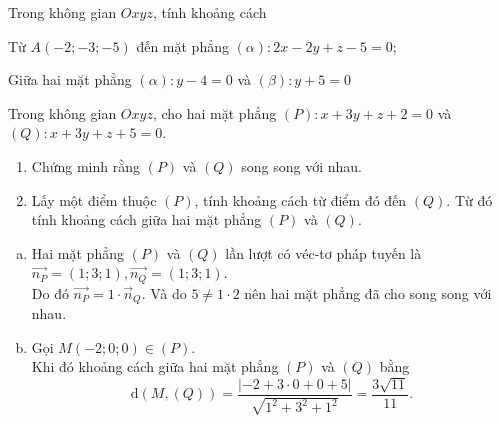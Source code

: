 \begin{vd}%
	Trong không gian $Oxyz$, tính khoảng cách
	\begin{listEX}
		\item Từ $ A(-2;-3;-5) $ đến mặt phẳng $ (\alpha) \colon 2x-2y+z-5=0 $;
		\item Giữa hai mặt phẳng $ (\alpha)\colon y-4=0 $ và $ (\beta)\colon y+5=0 $
	\end{listEX}
\end{vd}

\begin{vd}%
	Trong không gian $Oxyz$, cho hai mặt phẳng $(P)\colon x+3y+z+2=0$ và $ (Q)\colon x+3y+z+5=0$.
	\begin{enumerate}
		\item Chứng minh rằng $(P)$ và $(Q)$ song song với nhau.
		\item  Lấy một điểm thuộc $(P)$, tính khoảng cách từ điểm đó đến $(Q)$. Từ đó tính khoảng cách giữa hai mặt phẳng $(P)$ và $(Q)$.
	\end{enumerate}
	\loigiai
	{
		\begin{enumerate}[a)]
			\item Hai mặt phẳng $(P)$ và $(Q)$ lần lượt có véc-tơ pháp tuyến là $\vec{n_P}=(1;3;1),\vec{n_Q}=(1;3;1)$.\\
			Do đó $\vec{n_P}=1 \cdot \vec{n}_Q$. Và do $5 \ne 1 \cdot 2$ nên hai mặt phẳng đã cho song song với nhau.
			\item Gọi $M(-2;0;0) \in (P)$.\\
			Khi đó khoảng cách giữa hai mặt phẳng $(P)$ và $(Q)$ bằng
			\[ \mathrm{d}(M,(Q)) = \dfrac{|-2+3\cdot0 +0 +5|}{\sqrt{1^2+3^2+1^2}} = \dfrac{3\sqrt{11}}{11}. \]
		\end{enumerate}
	}
\end{vd}

